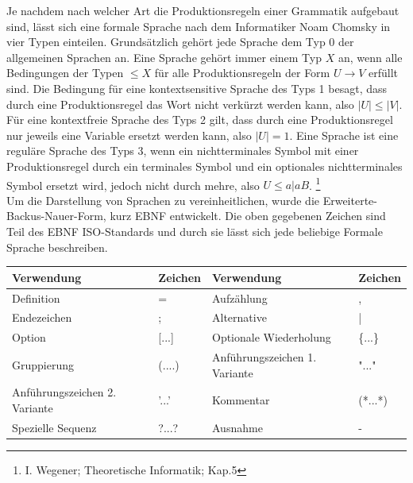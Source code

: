 Je nachdem nach welcher Art die Produktionsregeln einer Grammatik aufgebaut sind, lässt sich eine formale Sprache nach dem Informatiker Noam Chomsky in vier Typen einteilen. Grundsätzlich gehört jede Sprache dem Typ 0 der allgemeinen Sprachen an. Eine Sprache gehört immer einem Typ $X$ an, wenn alle Bedingungen  der Typen $\leq X$ für alle Produktionsregeln der Form $U \rightarrow V$ erfüllt sind. Die Bedingung für eine kontextsensitive Sprache des Typs 1 besagt, dass durch eine Produktionsregel das Wort nicht verkürzt werden kann, also $|U| \leq |V|$. Für eine kontextfreie Sprache des Typs 2 gilt, dass durch eine Produktionsregel nur jeweils eine Variable ersetzt werden kann, also $|U| = 1$. Eine Sprache ist eine reguläre Sprache des Typs 3, wenn ein nichtterminales Symbol mit einer Produktionsregel durch ein terminales Symbol und ein optionales nichtterminales Symbol ersetzt wird, jedoch nicht durch mehre, also $U \leq a|aB$. \footnote{I. Wegener;	Theoretische Informatik; Kap.5}\\
Um die Darstellung von Sprachen zu vereinheitlichen, wurde die Erweiterte-Backus-Nauer-Form, kurz EBNF entwickelt. Die oben gegebenen Zeichen sind Teil des EBNF ISO-Standards und durch sie lässt sich jede beliebige Formale Sprache beschreiben.\\
\begin{table}[]
\begin{tabular}{|ll|ll|}
\hline
Verwendung                    & Zeichen   & Verwendung                    & Zeichen \\ \hline
Definition                    & =         & Aufzählung                    & ,       \\
Endezeichen                   & ;         & Alternative                   & |       \\
Option                        & {[}...{]} & Optionale Wiederholung        & \{...\} \\
Gruppierung                   & (....)    & Anführungszeichen 1. Variante & "..."   \\
Anführungszeichen 2. Variante & '...'     & Kommentar                      & (*...*) \\
Spezielle Sequenz             & ?...?     & Ausnahme                      & -       \\ \hline
\end{tabular}
\end{table}
 

